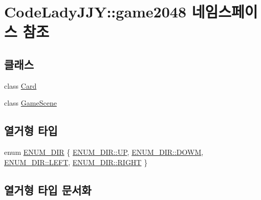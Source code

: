 \hypertarget{namespace_code_lady_j_j_y_1_1game2048}{}\section{Code\+Lady\+J\+JY\+:\+:game2048 네임스페이스 참조}
\label{namespace_code_lady_j_j_y_1_1game2048}
\subsection*{클래스}
\begin{DoxyCompactItemize}
\item 
class \hyperlink{class_code_lady_j_j_y_1_1game2048_1_1_card}{Card}
\item 
class \hyperlink{class_code_lady_j_j_y_1_1game2048_1_1_game_scene}{Game\+Scene}
\end{DoxyCompactItemize}
\subsection*{열거형 타입}
\begin{DoxyCompactItemize}
\item 
enum \hyperlink{namespace_code_lady_j_j_y_1_1game2048_a5ce81ccb99ee47dcef151e7f8c9da08f}{E\+N\+U\+M\+\_\+\+D\+IR} \{ \hyperlink{namespace_code_lady_j_j_y_1_1game2048_a5ce81ccb99ee47dcef151e7f8c9da08fafbaedde498cdead4f2780217646e9ba1}{E\+N\+U\+M\+\_\+\+D\+I\+R\+::\+UP}, 
\hyperlink{namespace_code_lady_j_j_y_1_1game2048_a5ce81ccb99ee47dcef151e7f8c9da08faa175ed5748a200aaf331a4284383e2cd}{E\+N\+U\+M\+\_\+\+D\+I\+R\+::\+D\+O\+WM}, 
\hyperlink{namespace_code_lady_j_j_y_1_1game2048_a5ce81ccb99ee47dcef151e7f8c9da08fa684d325a7303f52e64011467ff5c5758}{E\+N\+U\+M\+\_\+\+D\+I\+R\+::\+L\+E\+FT}, 
\hyperlink{namespace_code_lady_j_j_y_1_1game2048_a5ce81ccb99ee47dcef151e7f8c9da08fa21507b40c80068eda19865706fdc2403}{E\+N\+U\+M\+\_\+\+D\+I\+R\+::\+R\+I\+G\+HT}
 \}
\end{DoxyCompactItemize}


\subsection{열거형 타입 문서화}
\mbox{\label{namespace_code_lady_j_j_y_1_1game2048_a5ce81ccb99ee47dcef151e7f8c9da08f}} 
